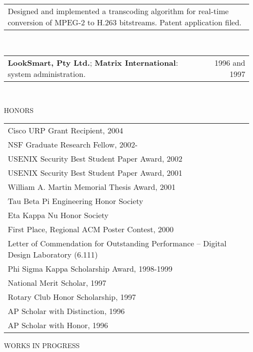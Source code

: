 \documentclass{article}
\begin{document}
\begin{flushleft}
\begin{tabular}{l@{\hspace{1.4in}}r}
\multicolumn{2}{p{7in}}{Designed and implemented a transcoding algorithm
for real-time conversion of MPEG-2 to H.263 bitstreams.
Patent application
filed.} \\ 
\end{tabular} \\
\vspace{0.1 in}
\begin{tabular}{l@{\hspace{1.5in}}r}
{{\bf LookSmart, Pty
Ltd.}; {\bf Matrix International}: system administration.} & { 1996 and
1997} \\  
\end{tabular} \\

\pagebreak

\vspace{0.15 in}
{\ag HONORS \hrulefill }\\ 
\vspace{0.1 in}
\begin{tabular}{p{7 in}}
{ Cisco URP Grant Recipient, 2004 } \\
{ NSF Graduate Research Fellow, 2002- } \\
{ USENIX Security Best Student Paper Award, 2002 } \\
{ USENIX Security Best Student Paper Award, 2001 } \\
{ William A. Martin Memorial Thesis Award, 2001 } \\
{ Tau Beta Pi Engineering Honor Society } \\ {Eta Kappa Nu Honor Society
} \\ { First Place, Regional ACM Poster Contest, 2000 } \\ {Letter of
Commendation for Outstanding Performance -- Digital Design Laboratory
(6.111) } \\ { Phi Sigma Kappa Scholarship Award, 1998-1999 } \\
{ National Merit Scholar, 1997 } \\ {Rotary Club Honor Scholarship, 1997
} \\ AP Scholar with Distinction, 1996\\ AP Scholar with Honor, 1996
\\
\end{tabular}


\vspace{0.15 in}
{\ag WORKS IN PROGRESS \hrulefill } \\
\vspace{0.1 in}
\begin{tabular}{p{7 in}}


\end{tabular}
\end{flushleft}
\end{document}
